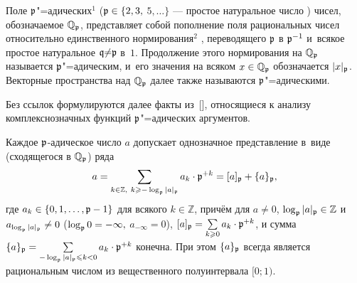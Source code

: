 Поле ${\mathfrak p}$"=адических$^1$%
\!(\mbox{${\mathfrak p}\in\{2, 3,$} $5, \dots\}$ --- простое натуральное число%
  )
  чисел, обозначаемое $\mathbb Q_{\mathfrak p}$, %
  представляет собой  пополнение   поля %
  рациональных чисел относительно единственного нормирования$^2$%
\!\!, %
  переводящего ${\mathfrak p}$ в ${\mathfrak p}^{-1}$ и~всякое простое натуральное $\mathfrak q{\ne}{\mathfrak p}$ в~$1$.
 Продолжение этого нормирования на $\mathbb Q_{\mathfrak p}$ называется ${\mathfrak p}$"=адическим, и~его значения на  всяком $x\in\mathbb Q_{\mathfrak p}$ обозначается $|x|_{\mathfrak p}$.
    Векторные пространства над $\mathbb Q_{\mathfrak p}$ далее
  также называются  ${\mathfrak p}$"=адическими.

  Без ссылок формулируются далее факты из~[], относящиеся к анализу ком\-плекс\-но\-знач\-ных функций  ${\mathfrak p}$"=адических аргументов.


Каждое ${\mathfrak p} $-адическое число $a$ допускает однозначное представление в~виде  (сходящегося в $\mathbb Q_{\mathfrak p}$)
   ряда 
$$ a=\mathop\sum\limits_{k\in\mathbb Z,\ k \geqslant -\log _\pad |a|_\pad} %
  a_k\cdot \pad^{+k}=[a]_\pad+\{a\}_\pad,
$$ 
  где  $a_k\in\{0, 1, \dots, {\mathfrak p}-1\}$  для всякого  $  k\in\mathbb Z  $, причём для $a\ne 0$,    $\log _{\mathfrak p} |a|_{\mathfrak p}\in\mathbb Z$  
  и~$ a_{\log _{\mathfrak p} |a|_{\mathfrak p}}\ne0$  (${\log _{\mathfrak p} 0= -\infty},$ $a_{-\infty}=0$),
  $[a]_{\mathfrak p}=\sum\limits_{  k\geqslant 0} a_k\cdot {\mathfrak p}^{+k}$,
  и сумма
  $\{a\}_{\mathfrak p}= \sum\limits_{ -\log_{\mathfrak p} |a|_{\mathfrak p} \leqslant k<0 }  a_k\cdot {\mathfrak p}^{+k}$  конечна.
   При этом $\{a\}_{\mathfrak p}$  всегда является рациональным числом  из вещественного полуинтервала $[0; 1)$.



